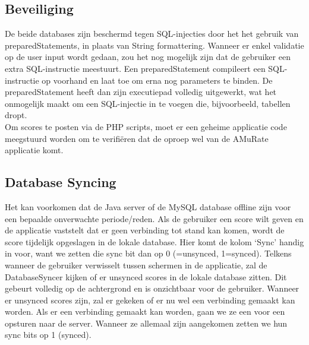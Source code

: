 \documentclass[11pt,a4paper]{article}
\begin{document}
	
	
	\subsection{Beveiliging}
	\label{sec:Beveiliging}
	De beide databases zijn beschermd tegen SQL-injecties door het het gebruik van preparedStatements, in plaats van String formattering. Wanneer er enkel validatie op de user input wordt gedaan, zou het nog mogelijk zijn dat de gebruiker een extra SQL-instructie meestuurt.
	Een preparedStatement compileert een SQL-instructie op voorhand en laat toe om erna nog parameters te binden. De preparedStatement heeft dan zijn executiepad volledig uitgewerkt, wat het onmogelijk maakt om een SQL-injectie in te voegen die, bijvoorbeeld, tabellen dropt. \\
	
	Om scores te posten via de PHP scripts, moet er een geheime applicatie code meegstuurd worden om te verifiëren dat de oproep wel van de AMuRate applicatie komt.
	
	
	\subsection{Database Syncing}
	\label{sec:Database Syncing}
	Het kan voorkomen dat de Java server of de MySQL database offline zijn voor een bepaalde onverwachte periode/reden. Als de gebruiker een score wilt geven en de applicatie vaststelt dat er geen verbinding tot stand kan komen, wordt de score tijdelijk opgeslagen in de lokale database. Hier komt de kolom `Sync' handig in voor, want we zetten die sync bit dan op 0 (=unsynced, 1=synced). Telkens wanneer de gebruiker verwisselt tussen schermen in de applicatie, zal de DatabaseSyncer kijken of er unsynced scores in de lokale database zitten. Dit gebeurt volledig op de achtergrond en is onzichtbaar voor de gebruiker. Wanneer er unsynced scores zijn, zal er gekeken of er nu wel een verbinding gemaakt kan worden. Als er een verbinding gemaakt kan worden, gaan we ze een voor een opsturen naar de server. Wanneer ze allemaal zijn aangekomen zetten we hun sync bits op 1 (synced).
		
\end{document}
